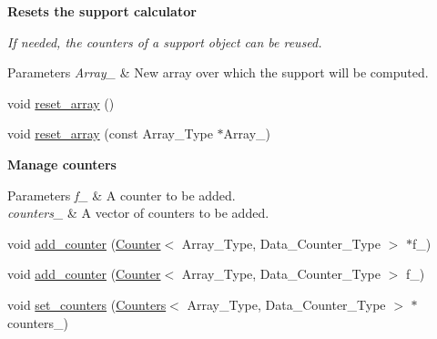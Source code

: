 \begin{Indent}\textbf{ Resets the support calculator}\par
{\em If needed, the counters of a support object can be reused.


\begin{DoxyParams}{Parameters}
{\em Array\+\_\+} & New array over which the support will be computed. \\
\hline
\end{DoxyParams}
}\begin{DoxyCompactItemize}
\item 
void \hyperlink{classbarry_1_1_support_a4f2860fd2e8e30703b91633a92ed7a58}{reset\+\_\+array} ()
\item 
void \hyperlink{classbarry_1_1_support_a6e39b22dfd1e0a0ceebf596c974f5326}{reset\+\_\+array} (const Array\+\_\+\+Type $\ast$Array\+\_\+)
\end{DoxyCompactItemize}
\end{Indent}
\begin{Indent}\textbf{ Manage counters}\par
{\em 
\begin{DoxyParams}{Parameters}
{\em f\+\_\+} & A counter to be added. \\
\hline
{\em counters\+\_\+} & A vector of counters to be added. \\
\hline
\end{DoxyParams}
}\begin{DoxyCompactItemize}
\item 
void \hyperlink{classbarry_1_1_support_a364df2c6295341f2801ebe0419d1d97c}{add\+\_\+counter} (\hyperlink{classbarry_1_1_counter}{Counter}$<$ Array\+\_\+\+Type, Data\+\_\+\+Counter\+\_\+\+Type $>$ $\ast$f\+\_\+)
\item 
void \hyperlink{classbarry_1_1_support_a00d511970c0bf833ef8bdd7580c670cc}{add\+\_\+counter} (\hyperlink{classbarry_1_1_counter}{Counter}$<$ Array\+\_\+\+Type, Data\+\_\+\+Counter\+\_\+\+Type $>$ f\+\_\+)
\item 
void \hyperlink{classbarry_1_1_support_aef83474cda55c4ed52e313e8ed948b08}{set\+\_\+counters} (\hyperlink{classbarry_1_1_counters}{Counters}$<$ Array\+\_\+\+Type, Data\+\_\+\+Counter\+\_\+\+Type $>$ $\ast$counters\+\_\+)
\end{DoxyCompactItemize}
\end{Indent}
